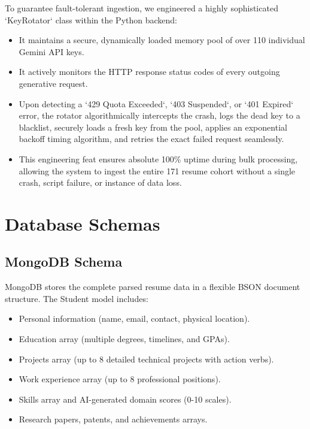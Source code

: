 \documentclass[12pt,a4paper]{report}
\begin{document}
To guarantee fault-tolerant ingestion, we engineered a highly sophisticated `KeyRotator` class within the Python backend:
\begin{itemize}
    \item It maintains a secure, dynamically loaded memory pool of over 110 individual Gemini API keys.
    \item It actively monitors the HTTP response status codes of every outgoing generative request.
    \item Upon detecting a `429 Quota Exceeded`, `403 Suspended`, or `401 Expired` error, the rotator algorithmically intercepts the crash, logs the dead key to a blacklist, securely loads a fresh key from the pool, applies an exponential backoff timing algorithm, and retries the exact failed request seamlessly.
    \item This engineering feat ensures absolute 100\% uptime during bulk processing, allowing the system to ingest the entire 171 resume cohort without a single crash, script failure, or instance of data loss.
\end{itemize}

\section{Database Schemas}

\subsection{MongoDB Schema}
MongoDB stores the complete parsed resume data in a flexible BSON document structure. The Student model includes:
\begin{itemize}
    \item Personal information (name, email, contact, physical location).
    \item Education array (multiple degrees, timelines, and GPAs).
    \item Projects array (up to 8 detailed technical projects with action verbs).
    \item Work experience array (up to 8 professional positions).
    \item Skills array and AI-generated domain scores (0-10 scales).
    \item Research papers, patents, and achievements arrays.
\end{itemize}
\end{document}
